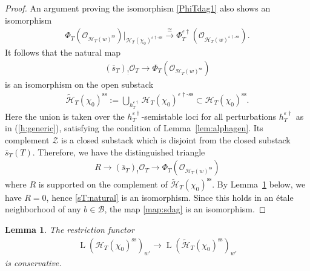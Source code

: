 \documentclass[11pt,oneside,a4paper,mathscr]{amsart}
\newtheorem{lemma}[thm]{Lemma}
\theoremstyle{definition}
\newcommand{\LL}{\operatorname{L}}
\newcommand{\cH}{\mathcal{H}}
\newcommand{\cB}{\mathcal{B}}
\newcommand{\vd}{\varepsilon\dag}
\newcommand{\vdss}{\varepsilon\dag\text{-ss}}
\begin{document}
\begin{proof}
An argument proving the isomorphism \eqref{PhiTdag1} also shows an isomorphism
\begin{align*}
\Phi_T(\mathcal{O}_{\cH_T(w)^{\mathrm{ss}}})
|_{\cH_T(\chi_0)^{\vdss}}
\stackrel{\cong}{\to}
\Phi_T^{\vd}
(\mathcal{O}_{\cH_T(w)^{\vdss}}).
\end{align*}
It follows that the natural map
\begin{align}\label{sT:natural}
    (\overline{s}_T)_{!}\mathcal{O}_T
    \to
    \Phi_T(\mathcal{O}_{\cH_T(w)^{\mathrm{ss}}})
\end{align}
is an isomorphism on the open substack
\begin{align*}
   \widetilde{\cH}_T(\chi_0)^{\mathrm{ss}} :=
    \bigcup_{h_T^{\vd}}
    \cH_T(\chi_0)^{\vdss}
    \subset
    \cH_T(\chi_0)^{\mathrm{ss}}.
\end{align*}
Here the union is taken over the $h_T^{\vd}$-semistable loci
for all perturbations $h_T^{\vd}$ as in (\ref{h:generic}), satisfying the condition of Lemma~\ref{lem:alphagen}.
Its complement $\mathcal{Z}$ is a closed substack which is disjoint
from the closed substack $\overline{s}_T(T)$. Therefore, we have the 
distinguished triangle
\begin{align*}
R \to  (\overline{s}_T)_{!}\mathcal{O}_T \to 
    \Phi_T(\mathcal{O}_{\cH_T(w)^{\mathrm{ss}}})
\end{align*}
where $R$ is supported on the complement of $\widetilde{\cH}_T(\chi_0)^{\mathrm{ss}}$. 
By Lemma~\ref{lem:consv} below, we have $R=0$, hence
\eqref{sT:natural} is an isomorphism.
Since this holds in an \'{e}tale neighborhood of any $b \in \cB$,
the map \eqref{map:sdag} is an isomorphism.
\end{proof}
\begin{lemma}\label{lem:consv}
    The restriction functor
    \begin{align*}
        \LL(\cH_T(\chi_0)^{\mathrm{ss}})_{w'}
        \to
        \LL(\widetilde{\cH}_T(\chi_0)^{\mathrm{ss}})_{w'}
    \end{align*}
    is conservative.
\end{lemma}
\end{document}
